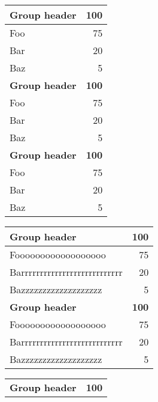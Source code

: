 \begin{sidewaystable}
\caption[Short caption for a complex sideways table]{A complex sideways table consisting of several parts}
\label{tab:introduction-sideways-table}
\centering
\setlength{\tabcolsep}{2pt}
\renewcommand{\arraystretch}{1.2}
\setlength\doublerulesep{2mm} 
\footnotesize
\begin{minipage}[t]{0.27\textwidth}
\begin{tabular}[t]{lr}
\toprule
\textbf{Group header} & \textbf{100}\\ 
\midrule
Foo & 75\\ 
Bar & 20\\
Baz & 5\\
\addlinespace
\addlinespace
\textbf{Group header} & \textbf{100}\\ 
\midrule
Foo & 75\\ 
Bar & 20\\
Baz & 5\\
\addlinespace
\addlinespace
\textbf{Group header} & \textbf{100}\\ 
\midrule
Foo & 75\\ 
Bar & 20\\
Baz & 5\\
\bottomrule
\end{tabular} 
\end{minipage}
\hspace{1mm}
\begin{minipage}[t]{0.445\textwidth}
\begin{tabular}[t]{lr}
\toprule
\textbf{Group header} & \textbf{100}\\ 
\midrule
Foooooooooooooooooo & 75\\ 
Barrrrrrrrrrrrrrrrrrrrrrrrrrr & 20\\
Bazzzzzzzzzzzzzzzzzzz & 5\\
\addlinespace
\addlinespace
\textbf{Group header} & \textbf{100}\\ 
\midrule
Foooooooooooooooooo & 75\\ 
Barrrrrrrrrrrrrrrrrrrrrrrrrrr & 20\\
Bazzzzzzzzzzzzzzzzzzz & 5\\
\bottomrule
\end{tabular} 
\end{minipage}
\hspace{1mm}
\begin{minipage}[t]{0.22\textwidth}
\begin{tabular}[t]{lr}
\toprule
\textbf{Group header} & \textbf{100}\\ 

\end{tabular}
\end{minipage}
\end{sidewaystable}
